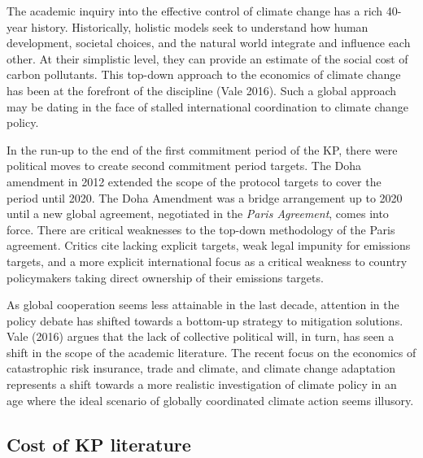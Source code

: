 \documentclass[
  10pt,
]{article}
\begin{document}
The academic inquiry into the effective control of climate change has a
rich 40-year history. Historically, holistic models seek to understand
how human development, societal choices, and the natural world integrate
and influence each other. At their simplistic level, they can provide an
estimate of the social cost of carbon pollutants. This top-down approach
to the economics of climate change has been at the forefront of the
discipline (Vale 2016). Such a global approach may be dating in the face
of stalled international coordination to climate change policy.

In the run-up to the end of the first commitment period of the KP, there
were political moves to create second commitment period targets. The
Doha amendment in 2012 extended the scope of the protocol targets to
cover the period until 2020. The Doha Amendment was a bridge arrangement
up to 2020 until a new global agreement, negotiated in the \emph{Paris
Agreement}, comes into force. There are critical weaknesses to the
top-down methodology of the Paris agreement. Critics cite lacking
explicit targets, weak legal impunity for emissions targets, and a more
explicit international focus as a critical weakness to country
policymakers taking direct ownership of their emissions targets.

As global cooperation seems less attainable in the last decade,
attention in the policy debate has shifted towards a bottom-up strategy
to mitigation solutions. Vale (2016) argues that the lack of collective
political will, in turn, has seen a shift in the scope of the academic
literature. The recent focus on the economics of catastrophic risk
insurance, trade and climate, and climate change adaptation represents a
shift towards a more realistic investigation of climate policy in an age
where the ideal scenario of globally coordinated climate action seems
illusory.

\hypertarget{cost-of-kp-literature}{%
\subsection{Cost of KP literature}\label{cost-of-kp-literature}}
\end{document}
